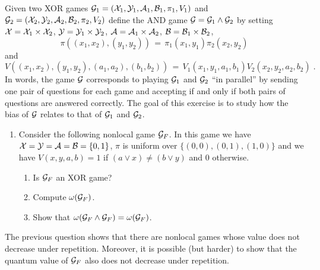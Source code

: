 \begin{exercise}
Given two XOR games $\mathcal{G}_1 = (\mathcal{X}_1,\mathcal{Y}_1,\mathcal{A}_1,\mathcal{B}_1,\pi_1,V_1)$ and  $\mathcal{G}_2 = (\mathcal{X}_2,\mathcal{Y}_2,\mathcal{A}_2,\mathcal{B}_2,\pi_2,V_2)$ define the AND game $\mathcal{G} = \mathcal{G}_1\wedge \mathcal{G}_2$ by setting $\mathcal{X} = \mathcal{X}_1\times \mathcal{X}_2$, $\mathcal{Y} = \mathcal{Y}_1\times \mathcal{Y}_2$, $\mathcal{A} = \mathcal{A}_1\times \mathcal{A}_2$, $\mathcal{B} = \mathcal{B}_1\times \mathcal{B}_2$, 
\begin{equation}\label{eq:pi-parallel}
\pi((x_1,x_2),(y_1,y_2))\,=\,\pi_1(x_1,y_1)\pi_2(x_2,y_2)
\end{equation}
 and 
\[ V((x_1,x_2),(y_1,y_2),(a_1,a_2),(b_1,b_2))\,=\, V_1(x_1,y_1,a_1,b_1) V_2(x_2,y_2,a_2,b_2)\;.\]
In words, the game $\mathcal{G}$ corresponds to playing $\mathcal{G}_1$ and $\mathcal{G}_2$ ``in parallel'' by sending one pair of questions for each game and accepting if and only if both pairs of questions are answered correctly.  The goal of this exercise is to study how the bias of $\mathcal{G}$ relates to that of $\mathcal{G}_1$ and $\mathcal{G}_2$. 
\begin{enumerate}
\item Consider the following nonlocal game $\mathcal{G}_F$. In this game we have $\mathcal{X}=\mathcal{Y}=\mathcal{A}=\mathcal{B}=\{0,1\}$, $\pi$ is uniform over $\{(0,0),(0,1),(1,0)\}$ and we have $V(x,y,a,b) = 1$ if $(a\vee x) \neq (b \vee y)$ and $0$ otherwise. 
\begin{enumerate}
\item Is $\mathcal{G}_F$ an XOR game? 
\item Compute $\omega(\mathcal{G}_F)$. 
\item Show that $\omega(\mathcal{G}_F \wedge \mathcal{G}_F)= \omega(\mathcal{G}_F)$. 
\end{enumerate}
\end{enumerate}
The previous question shows that there are nonlocal games whose value does not decrease under repetition. Moreover, it is possible (but harder) to show that the quantum value of $\mathcal{G}_F$ also does not decrease under repetition. 


\end{exercise}
